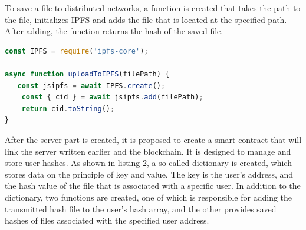\documentclass[10pt,conference,a4paper]{IEEEtran_EDM}
\begin{document}
To save a file to distributed networks, a function is created that takes the path to the file, initializes IPFS and adds the file that is located at the specified path. After adding, the function returns the hash of the saved file.


\lstset{style=mystyle}


\begin{lstlisting}[language=JavaScript, caption= Saving a file to IPFS]
const IPFS = require('ipfs-core');

async function uploadToIPFS(filePath) {
   const jsipfs = await IPFS.create();  
    const { cid } = await jsipfs.add(filePath);
    return cid.toString();
}

\end{lstlisting}

After the server part is created, it is proposed to create a smart contract that will link the server written earlier and the blockchain. It is designed to manage and store user hashes. As shown in listing 2, a so-called dictionary is created, which stores data on the principle of key and value. The key is the user's address, and the hash value of the file that is associated with a specific user. In addition to the dictionary, two functions are created, one of which is responsible for adding the transmitted hash file to the user's hash array, and the other provides saved hashes of files associated with the specified user address.



\end{document}
